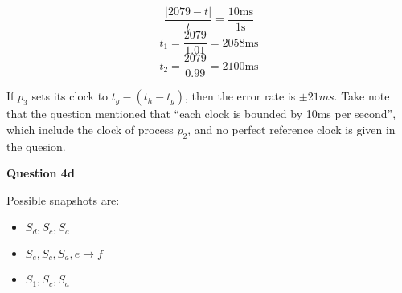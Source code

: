 \documentclass[11pt,a4paper]{report}
\begin{document}
\begin{multicols*}{2}
$$\frac{|2079-t|}{t} = \frac{10\text{ms}}{1\text{s}}$$
$$t_1 = \frac{2079}{1.01} = 2058\text{ms}$$
$$t_2 = \frac{2079}{0.99} = 2100\text{ms}$$

\noindent If $p_3$ sets its clock to $t_g - (t_h - t_g)$, then the error rate is $\pm 21ms$. Take note that the question mentioned that ``each clock is bounded by 10ms per second'', which include the clock of process $p_2$, and no perfect reference clock is given in the quesion.

\noindent \textbf{Question 4d}

\noindent Possible snapshots are:

\begin{itemize}
  \item $S_d, S_c, S_a$
  \item $S_e, S_c, S_a, e \rightarrow f$
  \item $S_1, S_c, S_a$
\end{itemize}

\end{multicols*}
\end{document}
